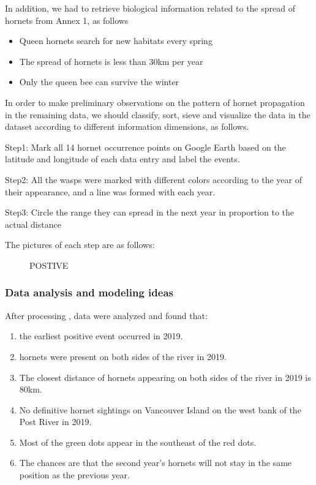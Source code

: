 \documentclass{mcmthesis}
\begin{document}
In addition, we had to retrieve biological information related to the spread of hornets from Annex 1, as follows

\begin{itemize}
\item Queen hornets search for new habitats every spring
\item The spread of hornets is less than 30km per year
\item Only the queen bee can survive the winter
\end{itemize}

In order to make preliminary observations on the pattern of hornet propagation in the remaining data, we should classify, sort, sieve and visualize the data in the dataset according to different information dimensions, as follows.

Step1: Mark all 14 hornet occurrence points on Google Earth based on the latitude and longitude of each data entry and label the events.

Step2: All the wasps were marked with different colors according to the year of their appearance, and a line was formed with each year.

Step3: Circle the range they can spread in the next year in proportion to the actual distance

The pictures of each step are as follows:

\begin{figure}[H]
\centering
{}
\caption{POSTIVE}
\label{POSTIVE}
\end{figure}

\subsubsection{Data analysis and modeling ideas}
After processing , data were analyzed and found that:

\begin{enumerate}
    \item the earliest positive event occurred in 2019.
    \item hornets were present on both sides of the river in 2019. 
    \item The closest distance of hornets appearing on both sides of the river in 2019 is 80km.
    \item No definitive hornet sightings on Vancouver Island on the west bank of the Post River in 2019.
    \item Most of the green dots appear in the southeast of the red dots.
    \item The chances are that the second year's hornets will not stay in the same position as the previous year.
\end{enumerate}
\end{document}
